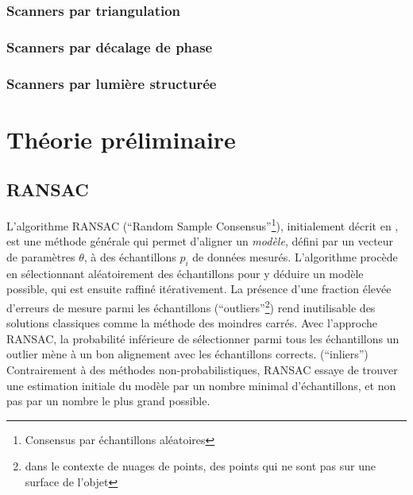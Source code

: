\documentclass[a4paper,10pt]{scrreprt}
\begin{document}
\subsubsection{Scanners par triangulation}
\subsubsection{Scanners par décalage de phase}
\subsubsection{Scanners par lumière structurée}


\section{Théorie préliminaire}

\subsection{RANSAC}
L'algorithme RANSAC (``Random Sample Consensus''\footnote{Consensus par échantillons aléatoires}), initialement décrit en \cite{Fisc1980}, est une méthode générale qui permet d'aligner un \emph{modèle}, défini par un vecteur de paramètres $\theta$, à des échantillons $p_i$ de données mesurés. L'algorithme procède en sélectionnant aléatoirement des échantillons pour y déduire un modèle possible, qui est ensuite raffiné itérativement. La présence d'une fraction élevée d'erreurs de mesure parmi les échantillons (``outliers''\footnote{dans le contexte de nuages de points, des points qui ne sont pas sur une surface de l'objet}) rend inutilisable des solutions classiques comme la méthode des moindres carrés. Avec l'approche RANSAC, la probabilité inférieure de sélectionner parmi tous les échantillons un outlier mène à un bon alignement avec les échantillons corrects. (``inliers'') Contrairement à des méthodes non-probabilistiques, RANSAC essaye de trouver une estimation initiale du modèle par un nombre minimal d'échantillons, et non pas par un nombre le plus grand possible.
\end{document}
